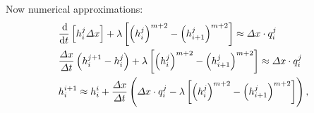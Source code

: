 Now numerical approximations:
\begin{align*}
    \begin{split}
        & \frac{\dif}{\dif{t}} \left [h_i^j \Delta x \right] + \lambda \left[\left(h_i^j\right)^{m+2} - \left(h_{i+1}^j\right)^{m+2} \right] \approx \Delta x \cdot q_i^j \\
        & \frac{\Delta x}{\Delta t} \left (h_i^{j+1} - h_i^j\right) + \lambda \left[\left(h_i^j\right)^{m+2} - \left(h_{i+1}^j\right)^{m+2} \right] \approx \Delta x \cdot q_i^j \\
        & h_i^{i+1} \approx h_i^{i} + \frac{\Delta x}{\Delta t} \left (\Delta x\cdot q_i^j - \lambda \left[\left(h_i^j\right)^{m+2} - \left(h_{i+1}^j\right)^{m+2} \right]  \right), \\
    \end{split}
\end{align*}

